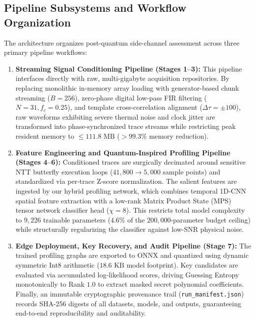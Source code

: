 \documentclass[letterpaper]{article}
\begin{document}
\subsection{Pipeline Subsystems and Workflow Organization}
The architecture organizes post-quantum side-channel assessment across three primary pipeline workflows:
\begin{enumerate}
    \item \textbf{Streaming Signal Conditioning Pipeline (Stages 1--3):} This pipeline interfaces directly with raw, multi-gigabyte acquisition repositories. By replacing monolithic in-memory array loading with generator-based chunk streaming ($B=256$), zero-phase digital low-pass FIR filtering ($N=31, f_c=0.25$), and template cross-correlation alignment ($\Delta \tau = \pm 100$), raw waveforms exhibiting severe thermal noise and clock jitter are transformed into phase-synchronized trace streams while restricting peak resident memory to $\le 111.8\text{ MB}$ ($>99.3\%$ memory reduction).
    \item \textbf{Feature Engineering and Quantum-Inspired Profiling Pipeline (Stages 4--6):} Conditioned traces are surgically decimated around sensitive NTT butterfly execution loops ($41{,}800 \to 5{,}000$ sample points) and standardized via per-trace Z-score normalization. The salient features are ingested by our hybrid profiling network, which combines temporal 1D-CNN spatial feature extraction with a low-rank Matrix Product State (MPS) tensor network classifier head ($\chi=8$). This restricts total model complexity to $9{,}226$ trainable parameters ($4.6\%$ of the $200{,}000$-parameter budget ceiling) while structurally regularizing the classifier against low-SNR physical noise.
    \item \textbf{Edge Deployment, Key Recovery, and Audit Pipeline (Stage 7):} The trained profiling graphs are exported to ONNX and quantized using dynamic symmetric Int8 arithmetic ($18.6\text{ KB}$ model footprint). Key candidates are evaluated via accumulated log-likelihood scores, driving Guessing Entropy monotonically to Rank $1.0$ to extract masked secret polynomial coefficients. Finally, an immutable cryptographic provenance trail (\texttt{run\_manifest.json}) records SHA-256 digests of all datasets, models, and outputs, guaranteeing end-to-end reproducibility and auditability.
\end{enumerate}
\end{document}
